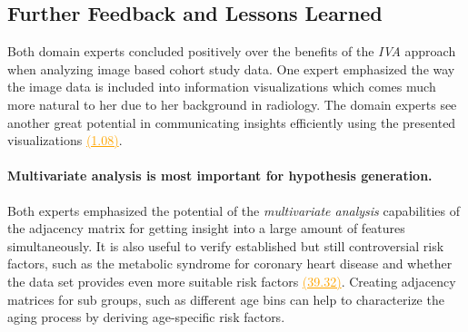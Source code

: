 \documentclass[journal]{style/vgtc} 			          %
\newcommand{\com}[1]{\textcolor{orange}{\uline{#1}}}
\begin{document}

\subsection{Further Feedback and Lessons Learned} \label{Lessons Learned}
%
Both domain experts concluded positively over the benefits of the \emph{IVA} approach when analyzing image based cohort study data.
%
One expert emphasized the way the image data is included into information visualizations which comes much more natural to her due to her background in radiology.
%
%
The domain experts see another great potential in communicating insights efficiently using the presented visualizations \com{(1.08)}.
%
\paragraph{Multivariate analysis is most important for hypothesis generation.}
Both experts emphasized the potential of the \emph{multivariate analysis} capabilities of the adjacency matrix for getting insight into a large amount of features simultaneously.
%
It is also useful to verify established but still controversial risk factors, such as the metabolic syndrome for coronary heart disease and whether the data set provides even more suitable risk factors \com{(39.32)}.
%
Creating adjacency matrices for sub groups, such as different age bins can help to characterize the aging process by deriving age-specific risk factors.
\end{document}
